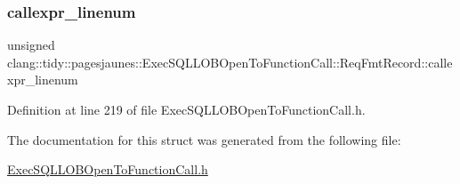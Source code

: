 \subsubsection{\texorpdfstring{callexpr\+\_\+linenum}{callexpr\_linenum}}
{\footnotesize\ttfamily unsigned clang\+::tidy\+::pagesjaunes\+::\+Exec\+S\+Q\+L\+L\+O\+B\+Open\+To\+Function\+Call\+::\+Req\+Fmt\+Record\+::callexpr\+\_\+linenum}



Definition at line 219 of file Exec\+S\+Q\+L\+L\+O\+B\+Open\+To\+Function\+Call.\+h.



The documentation for this struct was generated from the following file\+:\begin{DoxyCompactItemize}
\item 
\hyperlink{_exec_s_q_l_l_o_b_open_to_function_call_8h}{Exec\+S\+Q\+L\+L\+O\+B\+Open\+To\+Function\+Call.\+h}\end{DoxyCompactItemize}
